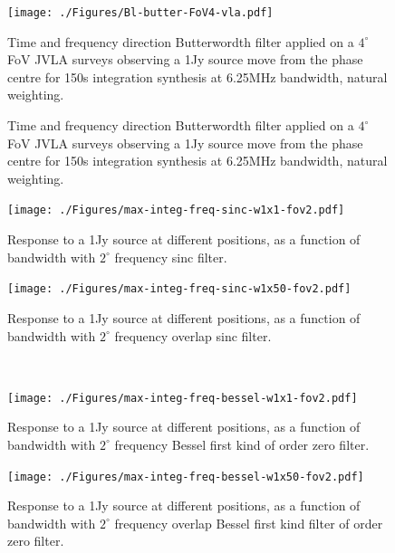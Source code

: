\documentclass[useAMS,usenatbib]{mn2e}
\begin{document}
\begin{figure}
  \hspace{1cm}
  \begin{minipage}{0.38\linewidth}
  \texttt{[image: ./Figures/Bl-butter-FoV4-vla.pdf]}
   \caption{Time and frequency 
   direction Butterwordth filter applied on a $4^{\circ}$ FoV JVLA surveys observing a 1Jy source move from the phase centre for 150s 
  integration synthesis at 6.25MHz bandwidth, natural weighting.}
  \label{fig:Bl-butter-FoV4}\end{minipage}
  \caption{Time and frequency 
  direction Butterwordth filter applied on a $4^{\circ}$ FoV JVLA surveys observing a 1Jy source move from the phase centre for 150s 
  integration synthesis at 6.25MHz bandwidth, natural weighting.}
  \end{figure} 
  \begin{figure}
    \centering
  \begin{minipage}{0.38\linewidth}\texttt{[image: ./Figures/max-integ-freq-sinc-w1x1-fov2.pdf]}
    \caption{Response to a 1Jy source at different positions, as a function of  bandwidth with $2^{\circ}$ frequency sinc filter.}
    \label{fig:max-integ-freq-sinc-w1x1-fov2}
  \end{minipage}
  \hspace{1cm}
  \begin{minipage}{0.38\linewidth}\texttt{[image: ./Figures/max-integ-freq-sinc-w1x50-fov2.pdf]}
        \caption{Response to a 1Jy source at different positions, as a function of bandwidth with $2^{\circ}$ frequency overlap sinc 
filter.}
        \label{fig:max-integ-freq-sinc-w1x50-fov2}
        \end{minipage}\\
  \begin{minipage}{0.38\linewidth}\texttt{[image: ./Figures/max-integ-freq-bessel-w1x1-fov2.pdf]}
        \caption{Response to a 1Jy source at different positions, as a function of bandwidth with $2^{\circ}$ frequency Bessel first kind 
of 
  order zero filter.}
        \label{fig:max-integ-freq-bessel-w1x1-fov2}
        \end{minipage}
  \hspace{1cm}
  \begin{minipage}{0.38\linewidth}\texttt{[image: ./Figures/max-integ-freq-bessel-w1x50-fov2.pdf]}
        \caption{Response to a 1Jy source at different positions, as a function of bandwidth with $2^{\circ}$ frequency overlap Bessel 
first kind filter of order zero filter.}
        \label{fig:max-integ-freq-bessel-w1x50-fov2}
        \end{minipage}

\end{figure}
\end{document}
